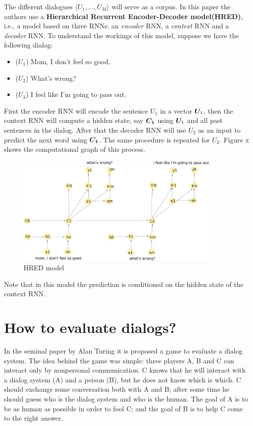 The different dialogues $\langle U_1 , \dots, U_M \rangle$ will serve as a corpus.
In this paper the authors use a \textbf{Hierarchical Recurrent Encoder-Decoder model(HRED)}, i.e., a model based on three RNNs: an \textit{encoder} RNN, a \textit{context} RNN and a \textit{decoder} RNN.  To understand the workings of this model, suppose we have the following dialog:
\begin{itemize}
\item ($U_1$) Mom, I don't feel so good.\\
\item ($U_2$) What's wrong?\\
\item ($U_3$) I feel like I'm going to pass out.
\end{itemize}

First the encoder RNN will encode the sentence $U_1$ in a vector $\bm{U}_1$, then the context RNN will compute a hidden state, say $\bm{C_1}$ using $\bm{U}_1$ and all past sentences in the dialog. After that the decoder RNN will use $U_2$ as an input to predict the next word using $\bm{C_1}$. The same procedure is repeated for $U_2$. Figure
x shows the computational graph of this process.

\begin{figure}[ht!]
\label{HRED}
\includegraphics[width=10cm]{img/HRED_placeholder.png}
\caption{HRED model}
\end{figure}

Note that in this model the prediction is conditioned on the hidden state of the context RNN.


\section{How to evaluate dialogs?}

\label{ch:03-eval}

In the seminal paper by Alan Turing \cite{Turing} it is proposed a game to evaluate a dialog system. The idea behind the game was simple: three players A, B and C can interact only by nonpersonal communication. C knows that he will interact with a dialog system (A) and a person (B), but he does not know which is which. C should exchange some conversation both with A and B; after some time he should guess who is the dialog system and who is the human. The goal of A is to be as human as possible in order to fool C; and the goal of B is to help C come to the right answer.

